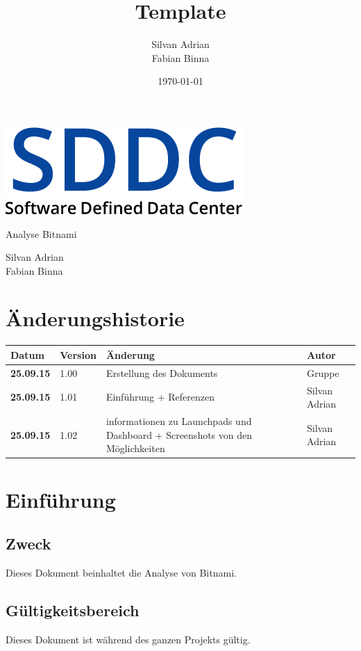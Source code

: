 \documentclass[11pt]{scrartcl}
\title{Template}
\author{Silvan Adrian \\ Fabian Binna}
\date{\today{}}
\begin{document}
\def\arraystretch{1.5}
\begin{titlepage}
\begin{center}
\vspace{10em}
\includegraphics[scale=2]{SDDC}
\vspace{10em}
\end{center}
\begin{center}
\huge {Analyse Bitnami}
\end{center}
\begin{center}
\vspace{10em}
\LARGE {Silvan Adrian} \\
\LARGE {Fabian Binna}
\end{center}

\end{titlepage}

\newpage
\section{Änderungshistorie}
\begin{tabularx}{\linewidth}{l l X l}
\textbf{Datum} & \textbf{Version} & \textbf{Änderung}  & \textbf{Autor} \\
\hline
\textbf{25.09.15} & 1.00 & Erstellung des Dokuments & Gruppe \\
\textbf{25.09.15} & 1.01 & Einführung + Referenzen & Silvan Adrian \\
\textbf{25.09.15} & 1.02 & informationen zu Launchpads und Dashboard + 
Screenshots von den Möglichkeiten & Silvan Adrian \\
\end{tabularx}

\newpage
\tableofcontents
\newpage

\section{Einführung}
\subsection{Zweck}
Dieses Dokument beinhaltet die Analyse von Bitnami.
\subsection{Gültigkeitsbereich}
Dieses Dokument ist während des ganzen Projekts gültig.
\end{document}
